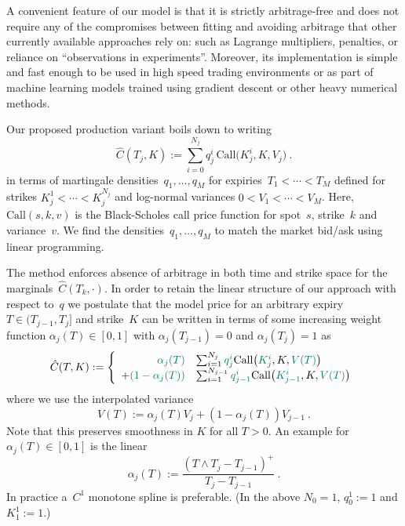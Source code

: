 \documentclass[twoside]{article}
\theoremstyle{plain}
\theoremstyle{definition}
\theoremstyle{remark}
\begin{document}
A convenient feature of our model is that it is strictly arbitrage-free and does not require any of the compromises between fitting and avoiding arbitrage that other currently available approaches rely on: such as Lagrange multipliers, penalties, or reliance on ``observations in experiments''. Moreover,
its implementation is simple and fast enough to be used in high speed trading environments or
as part of machine learning models
trained using gradient descent or other heavy numerical methods.

Our proposed production variant boils down to writing
\begin{equation}\label{eq:intromodel}
    \hat C(T_j,K) := \sum_{i=0}^{N_j} q^i_j\, \mathrm{Call}\big(K^i_j,K,V_j \big) \ .
\end{equation}
in terms of martingale densities~$q_1,\ldots,q_M$ for expiries~$T_1<\cdots<T_M$
defined for strikes $K^1_j<\cdots<K^{N_j}_j$ and log-normal variances $0<V_1<\cdots<V_M$. Here, $\mathrm{Call}(s,k,v)$ is the Black-Scholes call price function 
for spot~$s$, strike~$k$ and variance~$v$. We find the densities~$q_1,\ldots,q_M$ to match the market
bid/ask using linear programming.

The method enforces absence of arbitrage in both time and strike space for the marginals~$\hat C(T_k,\cdot)$. 
In order to retain the linear structure of our approach with respect to~$q$ we postulate that the model price for an arbitrary expiry~$T\in (T_{j-1},T_j]$
and strike~$K$ can be written in terms of some increasing weight function $\alpha_j(T) \in [0,1]$
with $\alpha_j(T_{j-1})=0$ and $\alpha_j(T_j)=1$ as
\begin{equation}\label{eq:intro_full_C}
    \hat C(T, K) := \left\{
            \begin{array}{rl}
               {\color{pinegreen}\alpha_j(T)} & \sum_{i=1}^{N_j} {\color{pinegreen} q_j^i} \mathrm{Call}\!\left({\color{pinegreen} K^i_j },  K, {\color{pinegreen} V(T) } \right)  \\
        + {\color{pinegreen}(1 - \alpha_j(T))} & \sum_{i=1}^{N_{j-1}} {\color{pinegreen}q_{j-1}^i } \mathrm{Call}\!\left( 
        {\color{pinegreen} K^i_{j-1} }, K, {\color{pinegreen}V(T)} \right) 
        \end{array}
        \right.
\end{equation}
where we use the interpolated variance
$$
    V(T) := \alpha_j(T) V_j + (1-\alpha_j(T)) V_{j-1} \ .
$$
Note that this preserves smoothness in $K$ for all $T>0$.
An example for $\alpha_j(T)\in[0,1]$ is the linear
$$
    \alpha_j(T) := \frac{ ( T\wedge T_j - T_{j-1} )^+ }{ T_j - T_{j-1} } \ .
$$
In  practice a~$C^1$ monotone spline is preferable. (In the above $N_0=1$, $q_0^1:=1$ and $K^1_1:=1$.)
\end{document}
